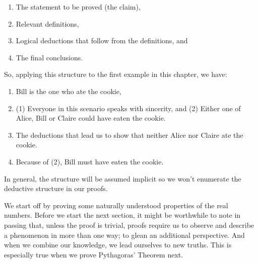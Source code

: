 \documentclass[../proofs.tex]{subfiles}
\begin{document}
 \begin{enumerate}
   \item The statement to be proved (the claim),
   \item Relevant definitions,
   \item Logical deductions that follow from the definitions, and
   \item The final conclusions.
 \end{enumerate}

 So, applying this structure to the first example in this chapter, we have:
 \begin{enumerate}
   \item Bill is the one who ate the cookie,
   \item (1) Everyone in this scenario speaks with sincerity, and 
   (2) Either one of Alice, Bill or Claire could have eaten the cookie.
   \item The deductions that lead us to show that neither Alice nor Claire
    ate the cookie.
   \item Because of (2), Bill must have eaten the cookie.
 \end{enumerate}
 In general, the structure will be assumed implicit so
 we won't enumerate the deductive structure in our proofs.


We start off by proving some naturally understood properties of the real numbers.
Before we start the next section, it might be worthwhile to note in passing
that, unless the proof is trivial, proofs require us to observe and describe
a phenomenon in more than one way; to glean an additional perspective. And when
we combine our knowledge, we lead ourselves to new truths. This is especially
true when we prove Pythagoras' Theorem next.

\end{document}
